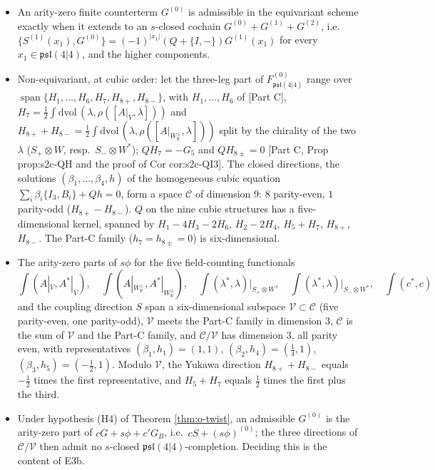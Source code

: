 \begin{proposition}
\label{prop:o-arity0}
\begin{itemize}
\item[(i)] An arity-zero finite counterterm $G^{(0)}$ is admissible in the equivariant scheme exactly when it extends to an $s$-closed cochain $G^{(0)}+G^{(1)}+G^{(2)}$, i.e.\ $\{S^{(1)}(x_1),G^{(0)}\}=(-1)^{|x_1|}(Q+\{I,-\})G^{(1)}(x_1)$ for every $x_1\in\mathfrak{psl}(4|4)$, and the higher components.
\item[(ii)] Non-equivariant, at cubic order: let the three-leg part of $F^{(0)}_{\mathfrak{psl}(4|4)}$ range over $\operatorname{span}\{H_1,\dots,H_6,H_7,H_{8+},H_{8-}\}$, with $H_1,\dots,H_6$ of [Part C], $H_7=\tfrac12\int\mathrm{dvol}\,(\lambda,\rho([A|_V,\lambda]))$ and $H_{8+}+H_{8-}=\tfrac12\int\mathrm{dvol}\,(\lambda,\rho([A|_{W_{\mathbb R}^\perp},\lambda]))$ split by the chirality of the two $\lambda$ ($S_+\otimes W$, resp.\ $S_-\otimes W^*$); $QH_7=-G_5$ and $QH_{8\pm}=0$ [Part C, Prop prop:s2c-QH and the proof of Cor cor:s2c-QI3]. The closed directions, the solutions $(\beta_1,\dots,\beta_4,h)$ of the homogeneous cubic equation $\sum_i\beta_i\{I_3,B_i\}+Qh=0$, form a space $\mathcal C$ of dimension $9$: $8$ parity-even, $1$ parity-odd ($H_{8+}-H_{8-}$). $Q$ on the nine cubic structures has a five-dimensional kernel, spanned by $H_1-4H_3-2H_6$, $H_2-2H_4$, $H_5+H_7$, $H_{8+}$, $H_{8-}$. The Part-C family ($h_7=h_{8\pm}=0$) is six-dimensional.
\item[(iii)] The arity-zero parts of $s\phi$ for the five field-counting functionals
\[
\int(A|_V,A^*|_V),\quad \int(A|_{W_{\mathbb R}^\perp},A^*|_{W_{\mathbb R}^\perp}),\quad \int(\lambda^*,\lambda)\big|_{S_+\otimes W},\quad \int(\lambda^*,\lambda)\big|_{S_-\otimes W^*},\quad \int(c^*,c)
\]
and the coupling direction $S$ span a six-dimensional subspace $\mathcal V\subset\mathcal C$ (five parity-even, one parity-odd), $\mathcal V$ meets the Part-C family in dimension $3$, $\mathcal C$ is the sum of $\mathcal V$ and the Part-C family, and $\mathcal C/\mathcal V$ has dimension $3$, all parity even, with representatives $(\beta_1,h_1)=(1,1)$, $(\beta_2,h_4)=(\tfrac14,1)$, $(\beta_3,h_5)=(-\tfrac12,1)$. Modulo $\mathcal V$, the Yukawa direction $H_{8+}+H_{8-}$ equals $-\tfrac12$ times the first representative, and $H_5+H_7$ equals $\tfrac12$ times the first plus the third.
\item[(iv)] Under hypothesis (H4) of Theorem \ref{thm:o-twist}, an admissible $G^{(0)}$ is the arity-zero part of $cG+s\phi+c'G_B$, i.e.\ $cS+(s\phi)^{(0)}$; the three directions of $\mathcal C/\mathcal V$ then admit no $s$-closed $\mathfrak{psl}(4|4)$-completion. Deciding this is the content of E3b.

\end{itemize}
\end{proposition}
